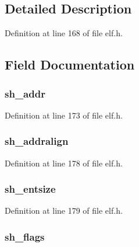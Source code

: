 \subsection{Detailed Description}


Definition at line 168 of file elf.\-h.



\subsection{Field Documentation}
\hypertarget{struct_elf64___shdr_ab3751166b9609d57a51f56092712637e}{
\subsubsection[{sh\-\_\-addr}]{ sh\-\_\-addr}}\label{struct_elf64___shdr_ab3751166b9609d57a51f56092712637e}


Definition at line 173 of file elf.\-h.

\hypertarget{struct_elf64___shdr_ac964d6e900deade6df35f60a3aa110b0}{
\subsubsection[{sh\-\_\-addralign}]{ sh\-\_\-addralign}}\label{struct_elf64___shdr_ac964d6e900deade6df35f60a3aa110b0}


Definition at line 178 of file elf.\-h.

\hypertarget{struct_elf64___shdr_aec7218de9050645a5f88eaea8ed51a7d}{
\subsubsection[{sh\-\_\-entsize}]{ sh\-\_\-entsize}}\label{struct_elf64___shdr_aec7218de9050645a5f88eaea8ed51a7d}


Definition at line 179 of file elf.\-h.

\hypertarget{struct_elf64___shdr_a9697ac357b0d3744bf15b6d30af583c9}{
\subsubsection[{sh\-\_\-flags}]{ sh\-\_\-flags}}\label{struct_elf64___shdr_a9697ac357b0d3744bf15b6d30af583c9}



